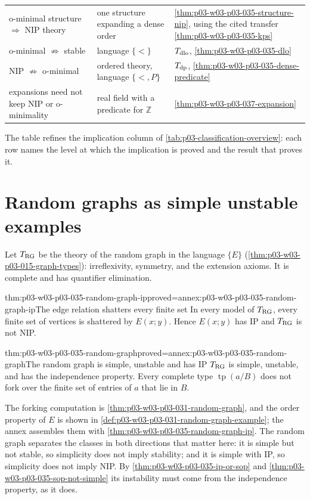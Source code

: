 \begin{longtable}{@{}p{}p{}p{}@{}}
\addlinespace
o-minimal structure \(\Rightarrow\) NIP theory & one structure
expanding a dense order & \cref{thm:p03-w03-p03-035-structure-nip}, using
the cited transfer \cref{thm:p03-w03-p03-035-kps} \\
\addlinespace
o-minimal \(\not\Rightarrow\) stable & language \(\{<\}\) &
\(T_{\rm dlo}\), \cref{thm:p03-w03-p03-035-dlo} \\
\addlinespace
NIP \(\not\Rightarrow\) o-minimal & ordered theory, language \(\{<,P\}\) &
\(T_{\rm dp}\), \cref{thm:p03-w03-p03-035-dense-predicate} \\
\addlinespace
expansions need not keep NIP or o-minimality & real field with a predicate
for \(\mathbb Z\) & \cref{thm:p03-w03-p03-037-expansion} \\
\bottomrule
\end{longtable}
\endgroup

The table refines the implication column of
\cref{tab:p03-classification-overview}: each row names the level at which
the implication is proved and the result that proves it.

\section{Random graphs as simple unstable examples}
\label{sec:p03-w03-p03-035-random-graph}

Let \(T_{\rm RG}\) be the theory of the random graph in the language
\(\{E\}\) (\cref{thm:p03-w03-p03-015-graph-types}): irreflexivity, symmetry,
and the extension axioms.  It is complete and has quantifier elimination.

\begin{hbtheorem}{thm:p03-w03-p03-035-random-graph-ip}{proved=annex:p03-w03-p03-035-random-graph-ip}{The edge relation shatters every finite set}
In every model of \(T_{\rm RG}\), every finite set of vertices is shattered
by \(E(x;y)\).  Hence \(E(x;y)\) has IP and \(T_{\rm RG}\) is not NIP.
\end{hbtheorem}

\begin{hbtheorem}{thm:p03-w03-p03-035-random-graph}{proved=annex:p03-w03-p03-035-random-graph}{The random graph is simple, unstable and has IP}
\(T_{\rm RG}\) is simple, unstable, and has the independence property.
Every complete type \(\operatorname{tp}(a/B)\) does not fork over the
finite set of entries of \(a\) that lie in \(B\).
\end{hbtheorem}

The forking computation is \cref{thm:p03-w03-p03-031-random-graph}, and the
order property of \(E\) is shown in \cref{def:p03-w03-p03-031-random-graph-example};
the annex assembles them with \cref{thm:p03-w03-p03-035-random-graph-ip}.
The random graph separates the classes in both directions that matter
here: it is simple but not stable, so simplicity does not imply stability;
and it is simple with IP, so simplicity does not imply NIP.  By
\cref{thm:p03-w03-p03-035-ip-or-sop} and
\cref{thm:p03-w03-p03-035-sop-not-simple} its instability must come from the
independence property, as it does.

